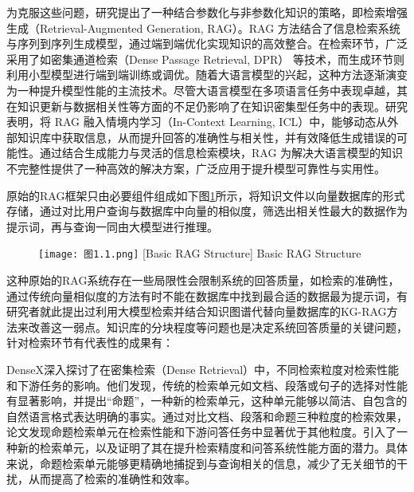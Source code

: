 为克服这些问题，研究\cite{gaoRetrievalAugmentedGenerationLarge2024}提出了一种结合参数化与非参数化知识的策略，即检索增强生成（Retrieval-Augmented Generation, RAG）。RAG 方法结合了信息检索系统与序列到序列生成模型\cite{gaoRetrievalAugmentedGenerationLarge2024}，通过端到端优化实现知识的高效整合。在检索环节，广泛采用了如密集通道检索（Dense Passage Retrieval, DPR）\cite{karpukhinDensePassageRetrieval2020} 等技术，而生成环节则利用小型模型进行端到端训练或调优\cite{izacardFewshotLearningRetrieval2022}。随着大语言模型的兴起，这种方法逐渐演变为一种提升模型性能的主流技术。尽管大语言模型在多项语言任务中表现卓越，其在知识更新与数据相关性等方面的不足仍影响了在知识密集型任务中的表现\cite{yaoEditingLargeLanguage2023,bangMultitaskMultilingualMultimodal2023}。研究\cite{heGRetrieverRetrievalAugmentedGeneration2024}表明，将 RAG 融入情境内学习（In-Context Learning, ICL）中，能够动态从外部知识库中获取信息，从而提升回答的准确性与相关性，并有效降低生成错误的可能性。通过结合生成能力与灵活的信息检索模块，RAG 为解决大语言模型的知识不完整性提供了一种高效的解决方案，广泛应用于提升模型可靠性与实用性。

原始的RAG框架只由必要组件组成如下图\ref{基础RAG结构}所示，将知识文件以向量数据库的形式存储，通过对比用户查询与数据库中向量的相似度，筛选出相关性最大的数据作为提示词，再与查询一同由大模型进行推理。

\begin{figure}[!htbp]
  \centering
  \texttt{[image: 图1.1.png]}
  [Basic RAG Structure]{ Basic RAG Structure}
  \label{基础RAG结构}
\end{figure}

这种原始的RAG系统存在一些局限性会限制系统的回答质量，如检索的准确性，通过传统向量相似度的方法有时不能在数据库中找到最合适的数据最为提示词，有研究者就此提出过利用大模型检索并结合知识图谱代替向量数据库的KG-RAG\cite{wangKnowledgeGraphPrompting2023}方法来改善这一弱点。知识库的分块程度等问题也是决定系统回答质量的关键问题，针对检索环节有代表性的成果有：

DenseX\cite{chenDenseRetrievalWhat2024}深入探讨了在密集检索（Dense Retrieval）中，不同检索粒度对检索性能和下游任务的影响。他们发现，传统的检索单元如文档、段落或句子的选择对性能有显著影响，并提出“命题”，一种新的检索单元，这种单元能够以简洁、自包含的自然语言格式表达明确的事实。通过对比文档、段落和命题三种粒度的检索效果，论文发现命题检索单元在检索性能和下游问答任务中显著优于其他粒度。引入了一种新的检索单元，以及证明了其在提升检索精度和问答系统性能方面的潜力。具体来说，命题检索单元能够更精确地捕捉到与查询相关的信息，减少了无关细节的干扰，从而提高了检索的准确性和效率。

